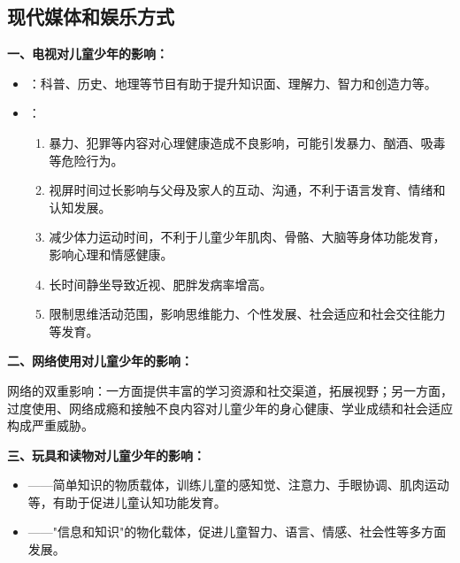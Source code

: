 \subsection{现代媒体和娱乐方式}

\begin{keybox}
\textbf{一、电视对儿童少年的影响：}

\begin{itemize}[leftmargin=*]
    \item {}：科普、历史、地理等节目有助于提升知识面、理解力、智力和创造力等。
    \item {}：
    \begin{enumerate}[leftmargin=*]
        \item 暴力、犯罪等内容对心理健康造成不良影响，可能引发暴力、酗酒、吸毒等危险行为。
        \item 视屏时间过长影响与父母及家人的互动、沟通，不利于语言发育、情绪和认知发展。
        \item 减少体力运动时间，不利于儿童少年肌肉、骨骼、大脑等身体功能发育，影响心理和情感健康。
        \item 长时间静坐导致近视、肥胖发病率增高。
        \item 限制思维活动范围，影响思维能力、个性发展、社会适应和社会交往能力等发育。
    \end{enumerate}
\end{itemize}

\textbf{二、网络使用对儿童少年的影响：}

网络的双重影响：一方面提供丰富的学习资源和社交渠道，拓展视野；另一方面，过度使用、网络成瘾和接触不良内容对儿童少年的身心健康、学业成绩和社会适应构成严重威胁。

\textbf{三、玩具和读物对儿童少年的影响：}

\begin{itemize}[leftmargin=*]
    \item {}——简单知识的物质载体，训练儿童的感知觉、注意力、手眼协调、肌肉运动等，有助于促进儿童认知功能发育。
    \item {}——"信息和知识"的物化载体，促进儿童智力、语言、情感、社会性等多方面发展。
\end{itemize}
\end{keybox}

\newpage
